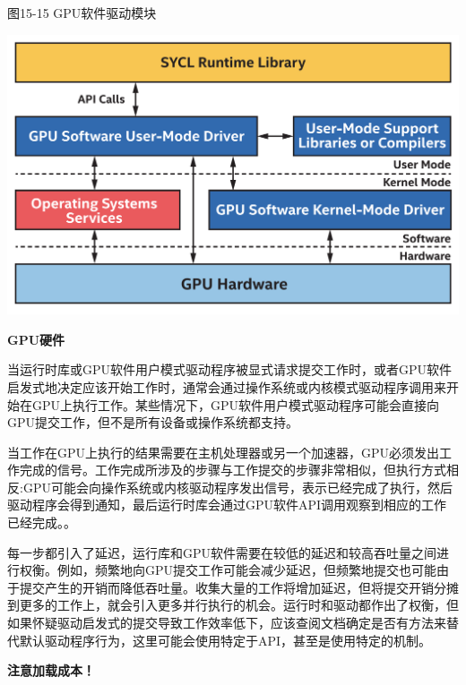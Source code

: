 \hspace*{\fill} \par %
图15-15 GPU软件驱动模块
\begin{center}
	\includegraphics[width=1.0\textwidth]{content/chapter-15/images/11}
\end{center}

\hspace*{\fill} \par %
\textbf{GPU硬件}

当运行时库或GPU软件用户模式驱动程序被显式请求提交工作时，或者GPU软件启发式地决定应该开始工作时，通常会通过操作系统或内核模式驱动程序调用来开始在GPU上执行工作。某些情况下，GPU软件用户模式驱动程序可能会直接向GPU提交工作，但不是所有设备或操作系统都支持。\par

当工作在GPU上执行的结果需要在主机处理器或另一个加速器，GPU必须发出工作完成的信号。工作完成所涉及的步骤与工作提交的步骤非常相似，但执行方式相反:GPU可能会向操作系统或内核驱动程序发出信号，表示已经完成了执行，然后驱动程序会得到通知，最后运行时库会通过GPU软件API调用观察到相应的工作已经完成。。\par

每一步都引入了延迟，运行库和GPU软件需要在较低的延迟和较高吞吐量之间进行权衡。例如，频繁地向GPU提交工作可能会减少延迟，但频繁地提交也可能由于提交产生的开销而降低吞吐量。收集大量的工作将增加延迟，但将提交开销分摊到更多的工作上，就会引入更多并行执行的机会。运行时和驱动都作出了权衡，但如果怀疑驱动启发式的提交导致工作效率低下，应该查阅文档确定是否有方法来替代默认驱动程序行为，这里可能会使用特定于API，甚至是使用特定的机制。\par

\hspace*{\fill} \par %
\textbf{注意加载成本！}


